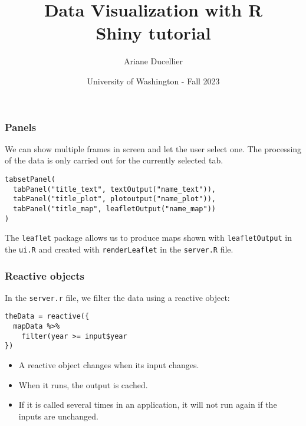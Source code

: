 \documentclass{beamer}
\title[Data Visualization with R - Shiny tutorial]{Data Visualization with R \\ Shiny tutorial}
\author{Ariane Ducellier}
\date{University of Washington - Fall 2023}
\begin{document}
	\begin{frame}
		\titlepage
	\end{frame}

	\begin{frame}[fragile]
		\frametitle{Panels}

		We can show multiple frames in screen and let the user select one. The processing of the data is only carried out for the currently selected tab.

		\vspace{1em}
		
		\begin{exampleblock}{}
		\begin{BVerbatim}
tabsetPanel(
  tabPanel("title_text", textOutput("name_text")),
  tabPanel("title_plot", plotoutput("name_plot")),
  tabPanel("title_map", leafletOutput("name_map"))
)
		\end{BVerbatim}
		\end{exampleblock}{}

		\vspace{1em}

		The \verb|leaflet| package allows us to produce maps shown with \verb|leafletOutput| in the \verb|ui.R| and created with \verb|renderLeaflet| in the \verb|server.R| file.

	\end{frame}

	\begin{frame}[fragile]
		\frametitle{Reactive objects}

		In the \verb|server.r| file, we filter the data using a reactive object:

		\vspace{1em}
		
		\begin{exampleblock}{}
		\begin{lstlisting}
theData = reactive({
  mapData %>%
    filter(year >= input$year
})
		\end{lstlisting}
		\end{exampleblock}{}

		\vspace{1em}

		\begin{itemize}
			\item A reactive object changes when its input changes.
			\item When it runs, the output is cached.
			\item If it is called several times in an application, it will not run again if the inputs are unchanged.
		\end{itemize}

	\end{frame}
\end{document}
